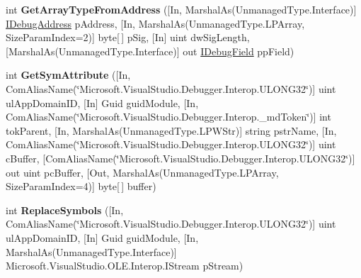 \begin{DoxyCompactItemize}
\item 
\hypertarget{interface_microsoft_1_1_visual_studio_1_1_debugger_1_1_interop_e_e_1_1_i_debug_com_plus_symbol_provider2_a9ab00e1cd2c985e86a546e7d9715e0c7}{int {\bfseries Get\+Array\+Type\+From\+Address} (\mbox{[}In, Marshal\+As(Unmanaged\+Type.\+Interface)\mbox{]} \hyperlink{interface_microsoft_1_1_visual_studio_1_1_debugger_1_1_interop_e_e_1_1_i_debug_address}{I\+Debug\+Address} p\+Address, \mbox{[}In, Marshal\+As(Unmanaged\+Type.\+L\+P\+Array, Size\+Param\+Index=2)\mbox{]} byte\mbox{[}$\,$\mbox{]} p\+Sig, \mbox{[}In\mbox{]} uint dw\+Sig\+Length, \mbox{[}Marshal\+As(Unmanaged\+Type.\+Interface)\mbox{]} out \hyperlink{interface_microsoft_1_1_visual_studio_1_1_debugger_1_1_interop_e_e_1_1_i_debug_field}{I\+Debug\+Field} pp\+Field)}\label{interface_microsoft_1_1_visual_studio_1_1_debugger_1_1_interop_e_e_1_1_i_debug_com_plus_symbol_provider2_a9ab00e1cd2c985e86a546e7d9715e0c7}

\item 
\hypertarget{interface_microsoft_1_1_visual_studio_1_1_debugger_1_1_interop_e_e_1_1_i_debug_com_plus_symbol_provider2_abf74240662eab86483cb3d82803507f0}{int {\bfseries Get\+Sym\+Attribute} (\mbox{[}In, Com\+Alias\+Name(\char`\"{}Microsoft.\+Visual\+Studio.\+Debugger.\+Interop.\+U\+L\+O\+N\+G32\char`\"{})\mbox{]} uint ul\+App\+Domain\+I\+D, \mbox{[}In\mbox{]} Guid guid\+Module, \mbox{[}In, Com\+Alias\+Name(\char`\"{}Microsoft.\+Visual\+Studio.\+Debugger.\+Interop.\+\_\+md\+Token\char`\"{})\mbox{]} int tok\+Parent, \mbox{[}In, Marshal\+As(Unmanaged\+Type.\+L\+P\+W\+Str)\mbox{]} string pstr\+Name, \mbox{[}In, Com\+Alias\+Name(\char`\"{}Microsoft.\+Visual\+Studio.\+Debugger.\+Interop.\+U\+L\+O\+N\+G32\char`\"{})\mbox{]} uint c\+Buffer, \mbox{[}Com\+Alias\+Name(\char`\"{}Microsoft.\+Visual\+Studio.\+Debugger.\+Interop.\+U\+L\+O\+N\+G32\char`\"{})\mbox{]} out uint pc\+Buffer, \mbox{[}Out, Marshal\+As(Unmanaged\+Type.\+L\+P\+Array, Size\+Param\+Index=4)\mbox{]} byte\mbox{[}$\,$\mbox{]} buffer)}\label{interface_microsoft_1_1_visual_studio_1_1_debugger_1_1_interop_e_e_1_1_i_debug_com_plus_symbol_provider2_abf74240662eab86483cb3d82803507f0}

\item 
\hypertarget{interface_microsoft_1_1_visual_studio_1_1_debugger_1_1_interop_e_e_1_1_i_debug_com_plus_symbol_provider2_a2bee4beb64e4b035b59f1aa4498e103b}{int {\bfseries Replace\+Symbols} (\mbox{[}In, Com\+Alias\+Name(\char`\"{}Microsoft.\+Visual\+Studio.\+Debugger.\+Interop.\+U\+L\+O\+N\+G32\char`\"{})\mbox{]} uint ul\+App\+Domain\+I\+D, \mbox{[}In\mbox{]} Guid guid\+Module, \mbox{[}In, Marshal\+As(Unmanaged\+Type.\+Interface)\mbox{]} Microsoft.\+Visual\+Studio.\+O\+L\+E.\+Interop.\+I\+Stream p\+Stream)}\label{interface_microsoft_1_1_visual_studio_1_1_debugger_1_1_interop_e_e_1_1_i_debug_com_plus_symbol_provider2_a2bee4beb64e4b035b59f1aa4498e103b}


\end{DoxyCompactItemize}
